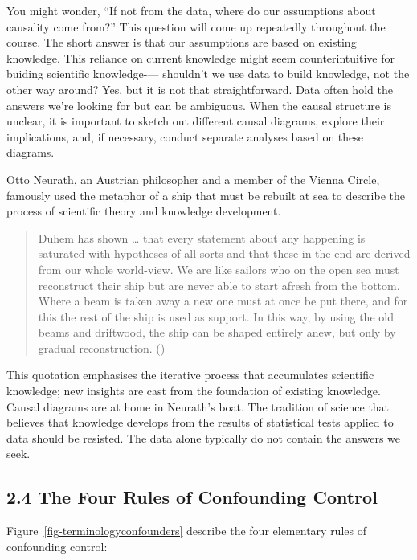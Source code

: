 \documentclass[
  singlecolumn]{article}
\begin{document}
You might wonder, ``If not from the data, where do our assumptions about
causality come from?'' This question will come up repeatedly throughout
the course. The short answer is that our assumptions are based on
existing knowledge. This reliance on current knowledge might seem
counterintuitive for buiding scientific knowledge-\/--- shouldn't we use
data to build knowledge, not the other way around? Yes, but it is not
that straightforward. Data often hold the answers we're looking for but
can be ambiguous. When the causal structure is unclear, it is important
to sketch out different causal diagrams, explore their implications,
and, if necessary, conduct separate analyses based on these diagrams.

Otto Neurath, an Austrian philosopher and a member of the Vienna Circle,
famously used the metaphor of a ship that must be rebuilt at sea to
describe the process of scientific theory and knowledge development.

\begin{quote}
Duhem has shown \ldots{} that every statement about any happening is
saturated with hypotheses of all sorts and that these in the end are
derived from our whole world-view. We are like sailors who on the open
sea must reconstruct their ship but are never able to start afresh from
the bottom. Where a beam is taken away a new one must at once be put
there, and for this the rest of the ship is used as support. In this
way, by using the old beams and driftwood, the ship can be shaped
entirely anew, but only by gradual reconstruction.
()
\end{quote}

This quotation emphasises the iterative process that accumulates
scientific knowledge; new insights are cast from the foundation of
existing knowledge. Causal diagrams are at home in Neurath's boat. The
tradition of science that believes that knowledge develops from the
results of statistical tests applied to data should be resisted. The
data alone typically do not contain the answers we seek.

\subsection{2.4 The Four Rules of Confounding
Control}\label{the-four-rules-of-confounding-control}

Figure~\ref{fig-terminologyconfounders} describe the four elementary
rules of confounding control:
\end{document}
